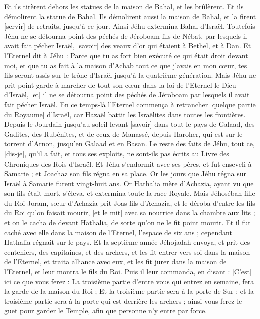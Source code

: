 \begin{multicols}{2}
Et ils tirèrent dehors les statues de la maison de Bahal, et les brûlèrent.
Et ils démolirent la statue de Bahal. Ils démolirent aussi la maison de Bahal, et la firent [servir] de retraits, jusqu'à ce jour.
Ainsi Jéhu extermina Bahal d'Israël.
Toutefois Jéhu ne se détourna point des péchés de Jéroboam fils de Nébat, par lesquels il avait fait pécher Israël, [savoir] des veaux d'or qui étaient à Bethel, et à Dan.
Et l'Eternel dit à Jéhu : Parce que tu as fort bien exécuté ce qui était droit devant moi, et que tu as fait à la maison d'Achab tout ce que j'avais en mon cœur, tes fils seront assis sur le trône d'Israël jusqu'à la quatrième génération.
Mais Jéhu ne prit point garde à marcher de tout son cœur dans la loi de l'Eternel le Dieu d'Israël, [et] il ne se détourna point des péchés de Jéroboam par lesquels il avait fait pécher Israël.
En ce temps-là l'Eternel commença à retrancher [quelque partie du Royaume] d'Israël, car Hazaël battit les Israëlites dans toutes les frontières.
Depuis le Jourdain jusqu'au soleil levant [savoir] dans tout le pays de Galaad, des Gadites, des Rubénites, et de ceux de Manassé, depuis Haroher, qui est sur le torrent d'Arnon, jusqu'en Galaad et en Basan.
Le reste des faits de Jéhu, tout ce, [dis-je], qu'il a fait, et tous ses exploits, ne sont-ils pas écrits au Livre des Chroniques des Rois d'Israël.
Et Jéhu s'endormit avec ses pères, et fut enseveli à Samarie ; et Joachaz son fils régna en sa place.
Or les jours que Jéhu régna sur Israël à Samarie furent vingt-huit ans.
\VerseOne{}Or Hathalia mère d'Achazia, ayant vu que son fils était mort, s'éleva, et extermina toute la race Royale.
Mais Jéhosébah fille du Roi Joram, sœur d'Achazia prit Joas fils d'Achazia, et le déroba d'entre les fils du Roi qu'on faisait mourir, [et le mit] avec sa nourrice dans la chambre aux lits ; et on le cacha de devant Hathalia, de sorte qu'on ne le fit point mourir.
Et il fut caché avec elle dans la maison de l'Eternel, l'espace de six ans ; cependant Hathalia régnait sur le pays.
Et la septième année Jéhojadah envoya, et prit des centeniers, des capitaines, et des archers, et les fit entrer vers soi dans la maison de l'Eternel, et traita alliance avec eux, et les fit jurer dans la maison de l'Eternel, et leur montra le fils du Roi.
Puis il leur commanda, en disant : [C'est] ici ce que vous ferez : La troisième partie d'entre vous qui entrez en semaine, fera la garde de la maison du Roi ;
Et la troisième partie sera à la porte de Sur ; et la troisième partie sera à la porte qui est derrière les archers ; ainsi vous ferez le guet pour garder le Temple, afin que personne n'y entre par force.

\end{multicols}
